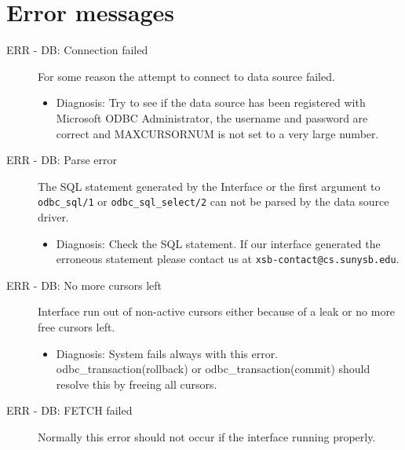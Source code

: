\section{Error messages}
\begin{description}
\item[ERR - DB: Connection failed] For some reason the attempt to connect
        to data source failed.
        \begin{itemize}
        \item   Diagnosis: Try to see if the data source has been registered 
                                  with Microsoft ODBC Administrator, the username and 
                                  password are correct and MAXCURSORNUM is not set 
                                  to a very large number.
        \end{itemize}

\item[ERR - DB: Parse error] The SQL statement generated by the
                          Interface or the first argument to {\tt odbc\_sql/1} or 
                       {\tt odbc\_sql\_select/2} can not be parsed by the data 
                              source driver.
        \begin{itemize}
        \item   Diagnosis: Check the SQL statement.  If our interface
                generated the erroneous statement please contact us at
                {\tt xsb-contact@cs.sunysb.edu}.
        \end{itemize}

\item[ERR - DB: No more cursors left] Interface run out of non-active
cursors either because of a leak or no
more free cursors left. 


\begin{itemize}

\item Diagnosis: System fails always with this error.  odbc\_transaction(rollback) or
           odbc\_transaction(commit) should resolve this by freeing all cursors.
\end{itemize}

\item[ERR - DB: FETCH failed] Normally this error should not occur if the 
interface running properly.
\begin{itemize}


\end{itemize}
\end{description}
